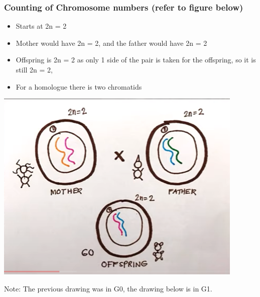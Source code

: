 \documentclass{article}
\begin{document}
\subsubsection*{Counting of Chromosome numbers (refer to figure below)}
\begin{itemize}
    \item Starts at 2n = 2
    \item Mother would have 2n = 2, and the father would have 2n = 2
    \item Offspring is 2n = 2 as only 1 side of the pair is taken for the offspring, so it is still 2n = 2, 
    \item For a homologue there is two chromatids
\end{itemize}
\includegraphics[scale=0.7]{G0Drawing.png}


Note: The previous drawing was in G0, the drawing below is in G1.
\end{document}
